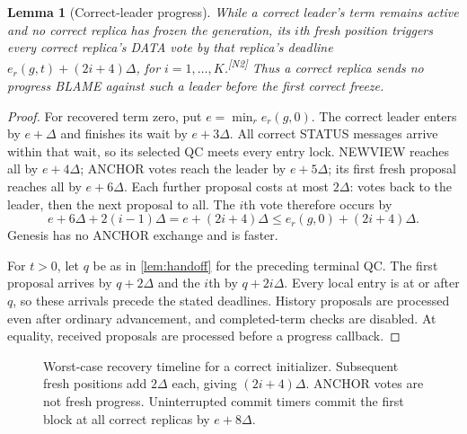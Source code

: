 \documentclass[11pt,a4paper]{article}
\newcommand{\NEW}[1]{{\color{diffNew}#1}}
\newcommand{\CH}[1]{\textsuperscript{\color{diffNew}\sffamily\scriptsize[#1]}}
\newcommand{\NEW}[1]{#1}
\newcommand{\CH}[1]{}
\newtheorem{lemma}[lemma]{Lemma}
\begin{document}
\begin{lemma}[Correct-leader progress]
\label{lem:progress}
While a correct leader's term remains active and no correct replica has
frozen the generation, its $i$th fresh position triggers every correct
replica's DATA vote by that replica's deadline
$e_r(g,t)+(2i+4)\Delta$, for $i=1,\ldots,K$.\CH{N2}
Thus a correct replica sends no progress BLAME against such a leader
before the first correct freeze.
\end{lemma}
\begin{proof}
For recovered term zero, put $e=\min_r e_r(g,0)$. The correct leader enters
by $e+\Delta$ and finishes its wait by $e+3\Delta$. All correct STATUS
messages arrive within that wait, so its selected QC meets every entry
lock. NEWVIEW reaches all by $e+4\Delta$; ANCHOR votes reach the leader
by $e+5\Delta$; its first fresh proposal reaches all by $e+6\Delta$.
Each further proposal costs at most $2\Delta$: votes back to the leader,
then the next proposal to all. The $i$th vote therefore occurs by
\[
 e+6\Delta+2(i-1)\Delta=e+(2i+4)\Delta
 \le e_r(g,0)+(2i+4)\Delta.
\]
Genesis has no ANCHOR exchange and is faster.

For $t>0$, let $q$ be as in \cref{lem:handoff} for the preceding terminal
QC. The first proposal arrives by $q+2\Delta$ and the $i$th by
$q+2i\Delta$. Every local entry is at or after $q$, so these arrivals
precede the stated deadlines. History proposals are processed even after
ordinary advancement, and completed-term checks are disabled. At equality,
received proposals are processed before a progress callback.
\end{proof}

\begin{figure}[htbp]\centering
{}
\caption{Worst-case recovery timeline for a correct initializer. Subsequent
fresh positions add $2\Delta$ each, giving $(2i+4)\Delta$. ANCHOR votes
are not fresh progress. Uninterrupted \NEW{commit} timers commit the first
block at all correct replicas by $e+8\Delta$.}
\label{fig:recovery}
\end{figure}
\FloatBarrier
\end{document}
